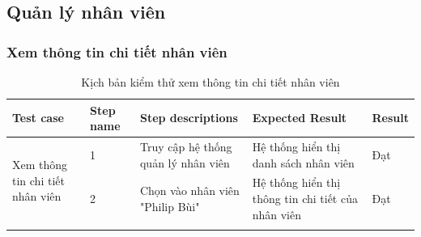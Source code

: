 \subsection{Quản lý nhân viên}
\subsubsection{ Xem thông tin chi tiết nhân viên}
{
    \setlength\extrarowheight{6pt}
    \begin{longtable}{| p{2.5cm}| p{1cm}| p{5.5cm}| p{4.5cm} | p{1.5cm} |}
        \hline
        \textbf{Test case}                                        & \textbf{Step name} & \textbf{Step descriptions}          & \textbf{Expected Result}                           & \textbf{Result} \\
        \hline
        \multirow[t]{2}{2.5cm}{ Xem thông tin chi tiết nhân viên} & 1                  & Truy cập hệ thống quản lý nhân viên & Hệ thống hiển thị danh sách nhân viên              & Đạt             \\
        \cline{2-5}
                                                                  & 2                  & Chọn vào nhân viên "Philip Bùi"     & Hệ thống hiển thị thông tin chi tiết của nhân viên & Đạt             \\
        \hline
        \caption{Kịch bản kiểm thử xem thông tin chi tiết nhân viên}
    \end{longtable}
}

